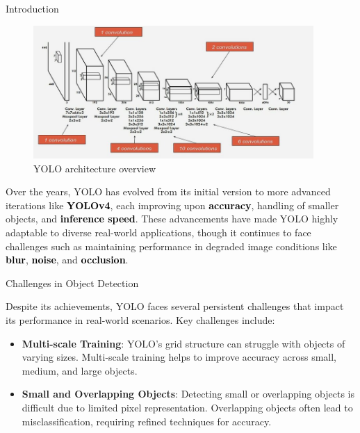\documentclass[final]{beamer}
\newlength{\colwidth}
\begin{document}
\begin{frame}[t]
\begin{columns}[t]
\begin{column}{\colwidth}
\begin{block}{Introduction}
    \vspace{0.3cm} %
    \begin{figure}
        \centering
        \includegraphics[width=0.95\textwidth]{logos/yolo_architecture.png}
        \caption{YOLO architecture overview}
        \label{fig:arch}
    \end{figure}
    
    Over the years, YOLO has evolved from its initial version to more advanced iterations like \textbf{\textcolor{black}{YOLOv4}}, each improving upon \textbf{\textcolor{black}{accuracy}}, handling of smaller objects, and \textbf{\textcolor{black}{inference speed}}. These advancements have made YOLO highly adaptable to diverse real-world applications, though it continues to face challenges such as maintaining performance in degraded image conditions like \textbf{\textcolor{black}{blur}}, \textbf{\textcolor{black}{noise}}, and \textbf{\textcolor{black}{occlusion}}.
\end{block}




\begin{block}{Challenges in Object Detection}
    \vspace{0.6cm} %

    Despite its achievements, YOLO faces several persistent challenges that impact its performance in real-world scenarios. Key challenges include:

    \begin{itemize}
      \item \textbf{Multi-scale Training}: YOLO’s grid structure can struggle with objects of varying sizes. Multi-scale training helps to improve accuracy across small, medium, and large objects.

      \item \textbf{Small and Overlapping Objects}: Detecting small or overlapping objects is difficult due to limited pixel representation. Overlapping objects often lead to misclassification, requiring refined techniques for accuracy.


\end{itemize}
\end{block}
\end{column}
\end{columns}
\end{frame}
\end{document}
